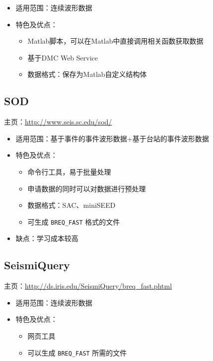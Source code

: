 \begin{itemize}
\item 适用范围：连续波形数据
\item 特色及优点：
    \begin{itemize}
    \item Matlab脚本，可以在Matlab中直接调用相关函数获取数据
    \item 基于DMC Web Service
    \item 数据格式：保存为Matlab自定义结构体
    \end{itemize}
\end{itemize}

\subsection{SOD}
主页：\url{http://www.seis.sc.edu/sod/}

\begin{itemize}
\item 适用范围：基于事件的事件波形数据+基于台站的事件波形数据
\item 特色及优点：
    \begin{itemize}
    \item 命令行工具，易于批量处理
    \item 申请数据的同时可以对数据进行预处理
    \item 数据格式：SAC、miniSEED
    \item 可生成 \texttt{BREQ_FAST} 格式的文件
    \end{itemize}
\item 缺点：学习成本较高
\end{itemize}

\subsection{SeismiQuery}
主页：\url{http://ds.iris.edu/SeismiQuery/breq_fast.phtml}

\begin{itemize}
\item 适用范围：连续波形数据
\item 特色及优点：
    \begin{itemize}
    \item 网页工具
    \item 可以生成 \texttt{BREQ\_FAST} 所需的文件
    \end{itemize}
\end{itemize}
